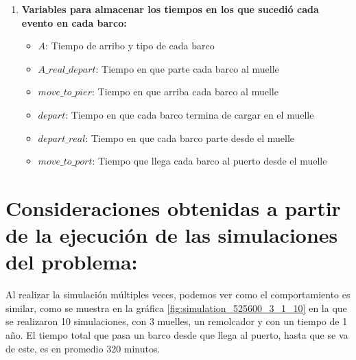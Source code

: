 \documentclass[titlepage,11pt]{scrartcl}
\begin{document}
\begin{enumerate}
\begin{itemize}
			\end{itemize}
		\item \textbf{Variables para almacenar los tiempos en los que sucedió cada evento en cada barco:}
			\begin{itemize}
				\item $A$: Tiempo de arribo y tipo de cada barco
    			\item $A\_real\_depart$: Tiempo en que parte cada barco al muelle
    			\item $move\_to\_pier$: Tiempo en que arriba cada barco al muelle
    			\item $depart$: Tiempo en que cada barco termina de cargar en el muelle
    			\item $depart\_real$: Tiempo en que cada barco parte desde el muelle
    			\item $move\_to\_port$: Tiempo que llega cada barco al puerto desde el muelle
			\end{itemize}
	\end{enumerate}


\section{Consideraciones obtenidas a partir de la ejecución de las simulaciones del
problema:}

	Al realizar la simulación múltiples veces, podemos ver como el comportamiento es similar, como se muestra en la gráfica \ref{fig:simulation_525600_3_1_10} en la que se realizaron 10 simulaciones, con 3 muelles, un remolcador y con un tiempo de 1 año. El tiempo total que pasa un barco desde que llega al puerto, hasta que se va de este, es en promedio 320 minutos.
	
\end{document}
